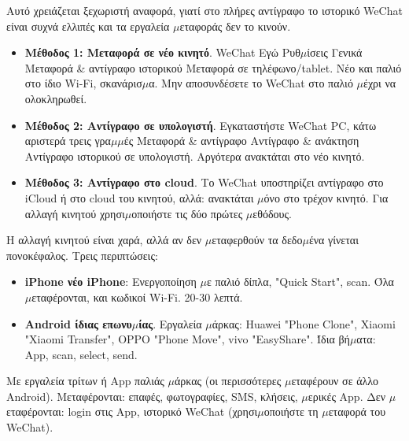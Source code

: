 Αυτό χρειάζεται ξεχωριστή αναφορά, γιατί στο πλήρες αντίγραφο το ιστορικό WeChat είναι συχνά ελλιπές και τα εργαλεία $\mu$εταφοράς δεν το κινούν.

\begin{itemize}
  \item \textbf{Μέθοδος 1: Μεταφορά σε νέο κινητό}. WeChat Εγώ Ρυθ$\mu$ίσεις Γενικά Μεταφορά \& αντίγραφο ιστορικού Μεταφορά σε τηλέφωνο/tablet. Νέο και παλιό στο ίδιο Wi-Fi, σκανάρισ$\mu$α. Μην αποσυνδέσετε το WeChat στο παλιό $\mu$έχρι να ολοκληρωθεί.
  \item \textbf{Μέθοδος 2: Αντίγραφο σε υπολογιστή}. Εγκαταστήστε WeChat PC, κάτω αριστερά τρεις γρα$\mu$$\mu$ές Μεταφορά \& αντίγραφο Αντίγραφο \& ανάκτηση Αντίγραφο ιστορικού σε υπολογιστή. Αργότερα ανακτάται στο νέο κινητό.
  \item \textbf{Μέθοδος 3: Αντίγραφο στο cloud}. Το WeChat υποστηρίζει αντίγραφο στο iCloud ή στο cloud του κινητού, αλλά: ανακτάται $\mu$όνο στο τρέχον κινητό. Για αλλαγή κινητού χρησι$\mu$οποιήστε τις δύο πρώτες $\mu$εθόδους.
\end{itemize}


Η αλλαγή κινητού είναι χαρά, αλλά αν δεν $\mu$εταφερθούν τα δεδο$\mu$ένα γίνεται πονοκέφαλος. Τρεις περιπτώσεις:


\begin{itemize}
  \item \textbf{iPhone νέο iPhone}: Ενεργοποίηση $\mu$ε παλιό δίπλα, "Quick Start", scan. Όλα $\mu$εταφέρονται, και κωδικοί Wi-Fi. 20-30 λεπτά.
  \item \textbf{Android ίδιας επωνυ$\mu$ίας}. Εργαλεία $\mu$άρκας: Huawei "Phone Clone", Xiaomi "Xiaomi Transfer", OPPO "Phone Move", vivo "EasyShare". Ίδια βή$\mu$ατα: App, scan, select, send.
\end{itemize}


Με εργαλεία τρίτων ή App παλιάς $\mu$άρκας (οι περισσότερες $\mu$εταφέρουν σε άλλο Android). Μεταφέρονται: επαφές, φωτογραφίες, SMS, κλήσεις, $\mu$ερικές App. Δεν $\mu$εταφέρονται: login στις App, ιστορικό WeChat (χρησι$\mu$οποιήστε τη $\mu$εταφορά του WeChat).


